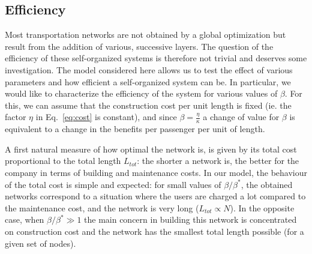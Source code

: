 \subsection{Efficiency}

 Most transportation networks are not obtained by a global optimization but result from the addition of various, successive layers. The question of the efficiency of these self-organized systems is therefore not trivial and deserves some investigation. The model considered here allows us to test the effect of various parameters and how efficient a self-organized system can be. In particular, we would like to characterize the efficiency of the system for various values of $\beta$. For this, we can assume that the construction cost per unit length is fixed (ie. the factor $\eta$ in Eq.~\ref{eq:cost} is constant), and since $\beta = \frac{\eta}{\kappa}$ a change of value for $\beta$ is equivalent to a change in the benefits per passenger per unit of length. 

A first natural measure of how optimal the network is, is given by its total cost proportional to the total length $L_{tot}$: the shorter a network is, the better for the company in terms of building and maintenance costs. In our model, the behaviour of the total cost is simple and expected: for small values of $\beta/\beta^*$, the obtained networks correspond to a situation where the users are charged a lot compared to the maintenance cost, and the network is very long ($L_{tot}\propto N$). In the opposite case, when $\beta/\beta^* \gg 1$ the main concern in building this network is concentrated on construction cost and the network has the smallest total length possible (for a given set of nodes). 

